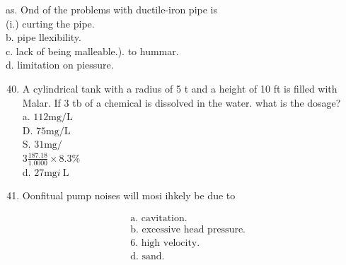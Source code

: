 \documentclass[10pt]{article}
\begin{document}
as. Ond of the problems with ductile-iron pipe is\\
(i.) curting the pipe.\\
b. pipe llexibility.\\
c. lack of being malleable.). to hummar.\\
d. limitation on piessure.

\begin{enumerate}
  \setcounter{enumi}{39}
  \item A cylindrical tank with a radius of 5 t and a height of 10 ft is filled with Malar. If 3 tb of a chemical is dissolved in the water. what is the dosage?\\
a. $112 \mathrm{mg} / \mathrm{L}$\\
D. $75 \mathrm{mg} / \mathrm{L}$\\
S. $31 \mathrm{mg} /$\\
$3 \frac{187.18}{1.0000} \times 8.3 \%$\\
d. $27 \mathrm{mg} i \mathrm{~L}$

  \item Oonfitual pump noises will mosi ihkely be due to

\end{enumerate}

$$
\begin{aligned}
&\text { a. cavitation. } \\
&\text { b. excessive head pressure. } \\
&\text { 6. high velocity. } \\
&\text { d. sand. }
\end{aligned}
$$
\end{document}
